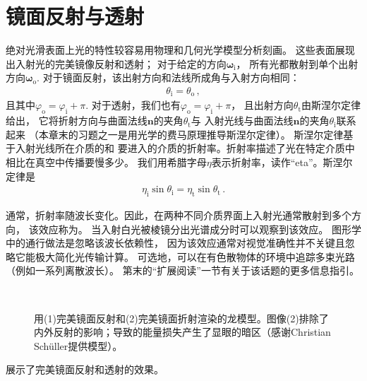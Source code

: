 \section{镜面反射与透射}\label{sec:镜面反射与透射}

绝对光滑表面上光的特性较容易用物理和几何光学模型分析刻画。
这些表面展现出入射光的完美镜像反射和透射；
对于给定的方向${\bm\omega}_{\mathrm{i}}$，
所有光都散射到单个出射方向${\bm\omega}_{\mathrm{o}}$.
对于镜面反射，该出射方向和法线所成角与入射方向相同：
\begin{align*}
    \theta_{\mathrm{i}}=\theta_{\mathrm{o}}\, ,
\end{align*}
且其中$\varphi_{\mathrm{o}}=\varphi_{\mathrm{i}}+\pi$.
对于透射，我们也有$\varphi_{\mathrm{o}}=\varphi_{\mathrm{i}}+\pi$，
且出射方向$\theta_{\mathrm{t}}$由斯涅尔定律给出，
它将折射方向与曲面法线$\bm n$的夹角$\theta_{\mathrm{t}}$与
入射光线与曲面法线$\bm n$的夹角$\theta_{\mathrm{i}}$联系起来
（本章末的习题之一是用光学的费马原理推导斯涅尔定律）。
斯涅尔定律基于入射光线所在介质的和
要进入的介质的折射率。折射率描述了光在特定介质中相比在真空中传播要慢多少。
我们用希腊字母$\eta$表示折射率，读作“eta”。斯涅尔定律是
\begin{align}
    \label{eq:8.2}
    \eta_{\mathrm{i}}\sin\theta_{\mathrm{i}}=\eta_{\mathrm{t}}\sin\theta_{\mathrm{t}}\, .
\end{align}

通常，折射率随波长变化。因此，在两种不同介质界面上入射光通常散射到多个方向，
该效应称为。
当入射白光被棱镜分出光谱成分时可以观察到该效应。
图形学中的通行做法是忽略该波长依赖性，
因为该效应通常对视觉准确性并不关键且忽略它能极大简化光传输计算。
可选地，可以在有色散物体的环境中追踪多束光路（例如一系列离散波长）。
第末的“扩展阅读”一节有关于该话题的更多信息指引。
\begin{figure}[htbp]
    \centering
    \\
    \caption{用(1)完美镜面反射和(2)完美镜面折射渲染的龙模型。图像(2)排除了
        内外反射的影响；导致的能量损失产生了显眼的暗区（感谢Christian Schüller提供模型）。}
    \label{fig:8.4}
\end{figure}

展示了完美镜面反射和透射的效果。

